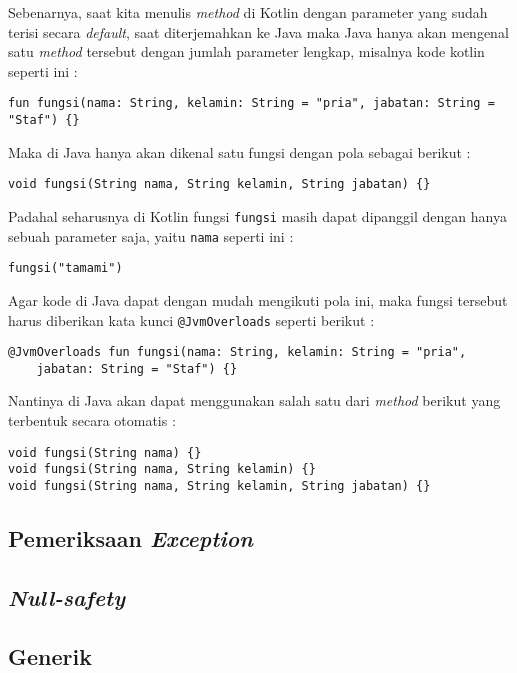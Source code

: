 Sebenarnya, saat kita menulis \textit{method} di Kotlin dengan parameter yang sudah terisi secara \textit{default}, saat diterjemahkan ke Java maka Java hanya akan mengenal satu \textit{method} tersebut dengan jumlah parameter lengkap, misalnya kode kotlin seperti ini :

\begin{lstlisting}
fun fungsi(nama: String, kelamin: String = "pria", jabatan: String = "Staf") {}
\end{lstlisting}

Maka di Java hanya akan dikenal satu fungsi dengan pola sebagai berikut :

\begin{lstlisting}
void fungsi(String nama, String kelamin, String jabatan) {}
\end{lstlisting}

Padahal seharusnya di Kotlin fungsi \texttt{fungsi} masih dapat dipanggil dengan hanya sebuah parameter saja, yaitu \texttt{nama} seperti ini :

\begin{lstlisting}
fungsi("tamami")
\end{lstlisting}

Agar kode di Java dapat dengan mudah mengikuti pola ini, maka fungsi tersebut harus diberikan kata kunci \texttt{@JvmOverloads} seperti berikut :

\begin{lstlisting}
@JvmOverloads fun fungsi(nama: String, kelamin: String = "pria", 
	jabatan: String = "Staf") {}
\end{lstlisting}

Nantinya di Java akan dapat menggunakan salah satu dari \textit{method} berikut yang terbentuk secara otomatis : 

\begin{lstlisting}
void fungsi(String nama) {}
void fungsi(String nama, String kelamin) {}
void fungsi(String nama, String kelamin, String jabatan) {}
\end{lstlisting}

\subsection{Pemeriksaan \textit{Exception}}

\subsection{\textit{Null-safety}}

\subsection{Generik}